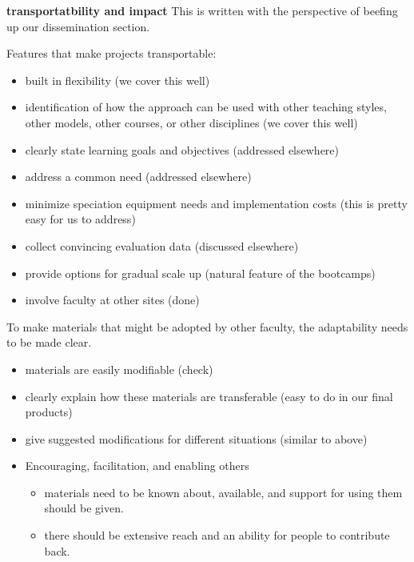 \documentclass[12pt]{article}
\begin{document}
\noindent \textbf{transportatbility and impact}
This is written with the perspective of beefing up our dissemination section.

Features that make projects transportable:
\begin{itemize}
\item built in flexibility (we cover this well)
\item identification of how the approach can be used with other teaching
  styles, other models, other courses, or other disciplines (we cover this
  well)
\item clearly state learning goals and objectives (addressed elsewhere)
\item address a common need (addressed elsewhere)
\item minimize speciation equipment needs and implementation costs (this is
  pretty easy for us to address)
\item collect convincing evaluation data (discussed elsewhere)
\item provide options for gradual scale up (natural feature of the bootcamps)
\item involve faculty at other sites (done)
\end{itemize}

To make materials that might be adopted by other faculty, the adaptability
needs to be made clear. 
\begin{itemize}
\item materials are easily modifiable (check)
\item clearly explain how these materials are transferable (easy to do in our
  final products)
\item give suggested modifications for different situations (similar to
  above)
\item Encouraging, facilitation, and enabling others 
  \begin{itemize}
  \item materials need to be known about, available, and support for using
    them should be given. 
  \item there should be extensive reach and an ability for people to
    contribute back.
  \end{itemize}
\end{itemize}
\end{document}
